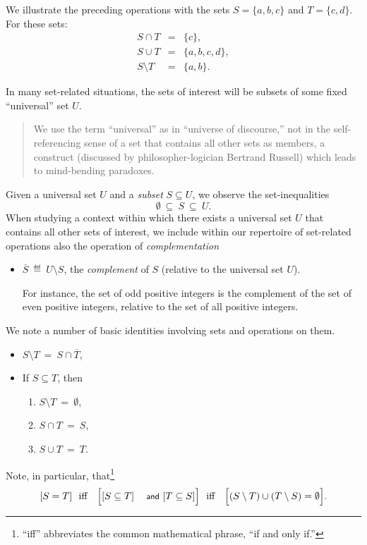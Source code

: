 We illustrate the preceding operations with the sets $S = \{a,b,c\}$
and $T = \{c,d\}$.  For these sets:
\begin{eqnarray*}
S \cap T & = &  \{c\}, \\
S \cup T & = & \{a,b,c,d\}, \\
S \setminus T & = & \{a,b\}.
\end{eqnarray*}

In many set-related situations, the sets of interest will be subsets
of some fixed ``universal'' set $U$.
\begin{quote}
We use the term ``universal'' as in ``universe of discourse,'' not in
the self-referencing sense of a set that contains all other sets as
members, a construct (discussed by philosopher-logician Bertrand
Russell) which leads to mind-bending paradoxes.
\end{quote}
Given a universal set $U$ and a {\em subset} $S \subseteq U$,
we observe the set-inequalities
\[ \emptyset \ \subseteq \ S \ \subseteq \ U. \]
When studying a context within which there exists a universal set $U$
that contains all other sets of interest, we include within our
repertoire of set-related operations also the operation of {\it
  complementation}
\begin{itemize}
\item
$\overline{S} \ \eqdef \ U \setminus S$,
the {\em complement} of $S$ (relative to the universal set $U$).

For instance, the set of odd positive integers is the complement of
the set of even positive integers, relative to the set of all positive
integers.
\end{itemize}
We note a number of basic identities involving sets and operations on
them.
\begin{itemize}
\item
$S \setminus T \ = \ S \cap \overline{T}$,
\item
If $S \subseteq T$, then
  \begin{enumerate}
  \item
$S \setminus T \ = \ \emptyset$,
  \item
$S \cap T \ = \ S$,
  \item
$S \cup T \ = \ T$.
  \end{enumerate}
\end{itemize}
Note, in particular, that\footnote{``iff'' abbreviates the common
mathematical phrase, ``if and only if.''}
\[ [S = T] \ \mbox{  iff  } \ \ \Bigl[[S \subseteq T] \mbox{
    {\small\sf and} } [T \subseteq S]\Bigr] \ \mbox{  iff  }
\ \ \Bigl[ (S \setminus T) \cup (T \setminus S) = \emptyset\Bigr].
\]

